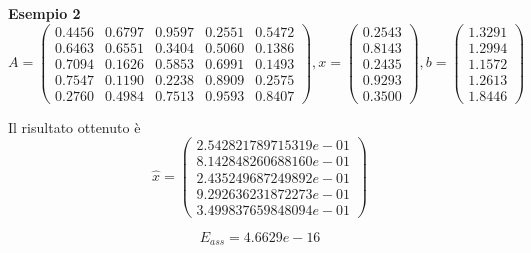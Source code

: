 \textbf{Esempio 2}
\[
A = \begin{pmatrix}
0.4456 & 0.6797 & 0.9597 & 0.2551 & 0.5472\\
0.6463 & 0.6551 & 0.3404 & 0.5060 & 0.1386\\
0.7094 & 0.1626 & 0.5853 & 0.6991 & 0.1493\\
0.7547 & 0.1190 & 0.2238 & 0.8909 & 0.2575\\
0.2760 & 0.4984 & 0.7513 & 0.9593 & 0.8407
\end{pmatrix}, x = \begin{pmatrix}
0.2543\\
0.8143\\
0.2435\\
0.9293\\
0.3500
\end{pmatrix}, b = \begin{pmatrix}
1.3291\\
1.2994\\
1.1572\\
1.2613\\
1.8446
\end{pmatrix}
\]

Il risultato ottenuto è
\[
\hat{x} = \begin{pmatrix}
2.542821789715319e-01\\
8.142848260688160e-01\\
2.435249687249892e-01\\
9.292636231872273e-01\\
3.499837659848094e-01
\end{pmatrix}
\]

\[
E_{ass} = 4.6629e-16
\]
